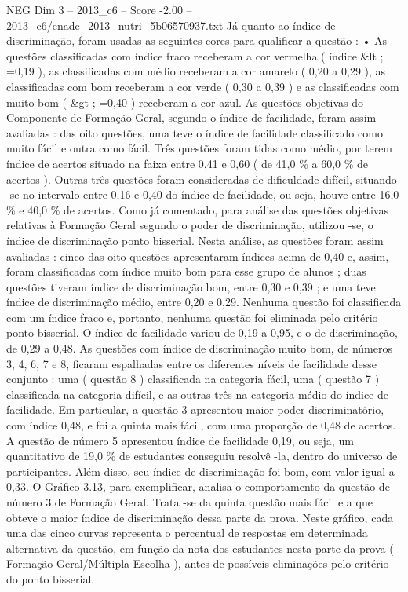 \begin{textsample}{NEG Dim 3 – 2013\_c6 – Score -2.00 – 2013\_c6/enade\_2013\_nutri\_5b06570937.txt}
Já quanto ao índice de discriminação, foram usadas as seguintes cores para qualificar a questão : • As questões classificadas com índice fraco receberam a cor vermelha ( índice \&lt ; =0,19 ), as classificadas com médio receberam a cor amarelo ( 0,20 a 0,29 ), as classificadas com bom receberam a cor verde ( 0,30 a 0,39 ) e as classificadas com muito bom ( \&gt ; =0,40 ) receberam a cor azul.
As questões objetivas do Componente de Formação Geral, segundo o índice de facilidade, foram assim avaliadas : das oito questões, uma teve o índice de facilidade classificado como muito fácil e outra como fácil.
Três questões foram tidas como médio, por terem índice de acertos situado na faixa entre 0,41 e 0,60 ( de 41,0 \% a 60,0 \% de acertos ).
Outras três questões foram consideradas de dificuldade difícil, situando -se no intervalo entre 0,16 e 0,40 do índice de facilidade, ou seja, houve entre 16,0 \% e 40,0 \% de acertos.
Como já comentado, para análise das questões objetivas relativas à Formação Geral segundo o poder de discriminação, utilizou -se, o índice de discriminação ponto bisserial.
Nesta análise, as questões foram assim avaliadas : cinco das oito questões apresentaram índices acima de 0,40 e, assim, foram classificadas com índice muito bom para esse grupo de alunos ; duas questões tiveram índice de discriminação bom, entre 0,30 e 0,39 ; e uma teve índice de discriminação médio, entre 0,20 e 0,29.
Nenhuma questão foi classificada com um índice fraco e, portanto, nenhuma questão foi eliminada pelo critério ponto bisserial.
O índice de facilidade variou de 0,19 a 0,95, e o de discriminação, de 0,29 a 0,48.
As questões com índice de discriminação muito bom, de números 3, 4, 6, 7 e 8, ficaram espalhadas entre os diferentes níveis de facilidade desse conjunto : uma ( questão 8 ) classificada na categoria fácil, uma ( questão 7 ) classificada na categoria difícil, e as outras três na categoria médio do índice de facilidade.
Em particular, a questão 3 apresentou maior poder discriminatório, com índice 0,48, e foi a quinta mais fácil, com uma proporção de 0,48 de acertos.
A questão de número 5 apresentou índice de facilidade 0,19, ou seja, um quantitativo de 19,0 \% de estudantes conseguiu resolvê -la, dentro do universo de participantes.
Além disso, seu índice de discriminação foi bom, com valor igual a 0,33.
O Gráfico 3.13, para exemplificar, analisa o comportamento da questão de número 3 de Formação Geral.
Trata -se da quinta questão mais fácil e a que obteve o maior índice de discriminação dessa parte da prova.
Neste gráfico, cada uma das cinco curvas representa o percentual de respostas em determinada alternativa da questão, em função da nota dos estudantes nesta parte da prova ( Formação Geral/Múltipla Escolha ), antes de possíveis eliminações pelo critério do ponto bisserial.

\end{textsample}
